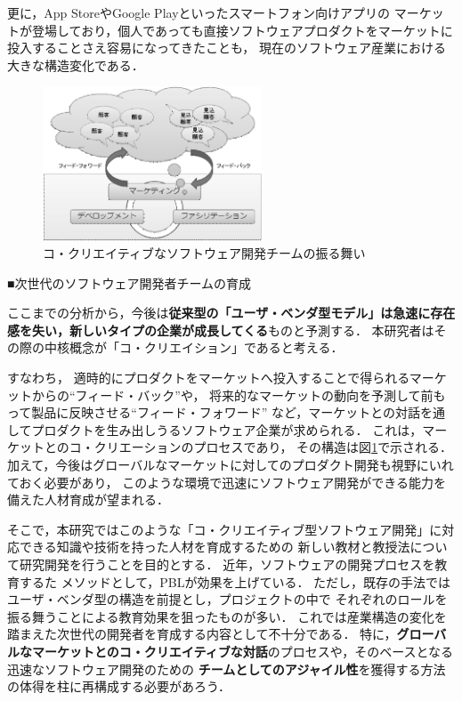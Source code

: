 \documentclass[11pt,a4paper,twoside]{jarticle}
\newcommand{\研究種別}{B}	%
\newcommand{\研究課題名}{コ・クリエイティブなソフトウェア開発者を育成するPBL型教育}
\newcommand{\研究機関名}{産業技術大学院大学}
\newcommand{\研究代表者氏名}{中鉢　欣秀}
\newcommand{\研究代表者氏名ふりがな}{ちゅうばち　よしひで}
\newcommand{\本応募effort}{\KLEffort{18}}	%
\newcommand{\研究期間の最終元号年度}{27}	%
\begin{document}
{    更に，App StoreやGoogle Playといったスマートフォン向けアプリの
    マーケットが登場しており，個人であっても直接ソフトウェアプロダクトをマーケットに投入することさえ容易になってきたことも，
    現在のソフトウェア産業における大きな構造変化である．
    
         \begin{figure}
			\vspace{-2cm}
         	\begin{center}
		         \includegraphics[width=6.5cm]{figs/CcSD.eps}
		         \caption{コ・クリエイティブなソフトウェア開発チームの振る舞い}
		         \label{fig:CcSD}
	         \end{center}
         \end{figure}
    
	\begin{flushleft}
		■次世代のソフトウェア開発者チームの育成
	\end{flushleft}

    ここまでの分析から，今後は{\bf 従来型の「ユーザ・ベンダ型モデル」は急速に存在感を失い，新しいタイプの企業が成長してくる}ものと予測する．
    本研究者はその際の中核概念が「コ・クリエイション」であると考える．
    
    すなわち，
    適時的にプロダクトをマーケットへ投入することで得られるマーケットからの``フィード・バック''や，
    将来的なマーケットの動向を予測して前もって製品に反映させる``フィード・フォワード''
    など，マーケットとの対話を通してプロダクトを生み出しうるソフトウェア企業が求められる．
    これは，マーケットとのコ・クリエーションのプロセスであり，
    その構造は図\ref{fig:CcSD}で示される．
    加えて，今後はグローバルなマーケットに対してのプロダクト開発も視野にいれておく必要があり，
    このような環境で迅速にソフトウェア開発ができる能力を備えた人材育成が望まれる．
    
    そこで，本研究ではこのような「コ・クリエイティブ型ソフトウェア開発」に対応できる知識や技術を持った人材を育成するための
    新しい教材と教授法について研究開発を行うことを目的とする．
    近年，ソフトウェアの開発プロセスを教育するた
    メソッドとして，PBLが効果を上げている．
    ただし，既存の手法ではユーザ・ベンダ型の構造を前提とし，プロジェクトの中で
    それぞれのロールを振る舞うことによる教育効果を狙ったものが多い．
    これでは産業構造の変化を踏まえた次世代の開発者を育成する内容として不十分である．
    特に，{\bf グローバルなマーケットとのコ・クリエイティブな対話}のプロセスや，そのベースとなる迅速なソフトウェア開発のための
    {\bf チームとしてのアジャイル性}を獲得する方法の体得を柱に再構成する必要があろう．
    
}
\end{document}
